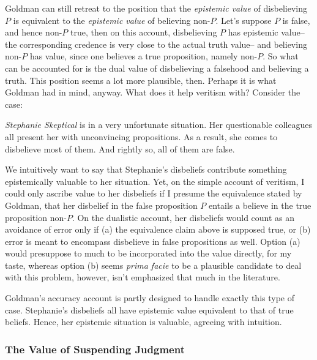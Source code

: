 \documentclass[12pt,numbers=noenddot]{scrartcl}
\begin{document}
Goldman can still retreat to the position that the \emph{epistemic value} of disbelieving $P$ is equivalent to the \emph{epistemic value} of believing non-$P$. Let's suppose $P$ is false, and hence non-$P$ true, then on this account, disbelieving $P$ has epistemic value–the corresponding credence is very close to the actual truth value– and believing non-$P$ has value, since one believes a true proposition, namely non-$P$. So what can be accounted for is the dual value of disbelieving a falsehood and believing a truth. This position seems a lot more plausible, then. Perhaps it is what Goldman had in mind, anyway. What does it help veritism with? Consider the case:

\begin{description}
   \item \emph{Stephanie Skeptical} is in a very unfortunate situation. Her questionable colleagues all present her with unconvincing propositions. As a result, she comes to disbelieve most of them. And rightly so, all of them are false.
\end{description}

We intuitively want to say that Stephanie's disbeliefs contribute something epistemically valuable to her situation. Yet, on the simple account of veritism, I could only ascribe value to her disbeliefs if I presume the equivalence stated by Goldman, that her disbelief in the false proposition $P$ entails a believe in the true proposition non-$P$. On the dualistic account, her disbeliefs would count as an avoidance of error only if (a) the equivalence claim above is supposed true, or (b) error is meant to encompass disbelieve in false propositions as well. Option (a) would presuppose to much to be incorporated into the value directly, for my taste, whereas option (b) seems \emph{prima facie} to be a plausible candidate to deal with this problem, however, isn't emphasized that much in the literature.

Goldman's accuracy account is partly designed to handle exactly this type of case. Stephanie's disbeliefs all have epistemic value equivalent to that of true beliefs. Hence, her epistemic situation is valuable, agreeing with intuition.

\subsubsection{The Value of Suspending Judgment}
\end{document}
